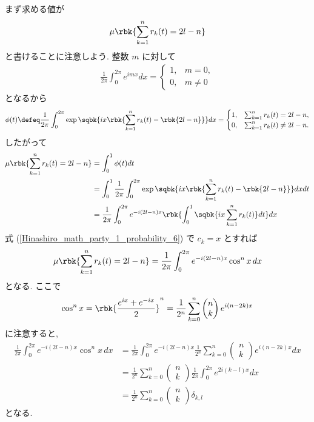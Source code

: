\documentclass[openany, a4paper, oneside]{jsbook}
\begin{document}
{まず求める値が
\begin{align}
 \mu \rbk{\sum_{k=1}^{n} r_k (t) = 2l - n}
\end{align}
と書けることに注意しよう.
整数 $m$ に対して
\begin{align}
 \frac{1}{2 \pi} \int_0^{2 \pi} e^{imx} dx
 =
 \begin{cases}
  1, & m=0, \\
  0, & m \neq 0
 \end{cases}
\end{align}
となるから
\begin{align}
 \phi (t)
 \defeq
 \frac{1}{2 \pi} \int_0^{2 \pi} \exp \sqbk{ix \rbk{\sum_{k=1}^{n} r_k (t) - \rbk{2l-n}}} dx
 =
 \begin{cases}
  1, &  \sum_{k=1}^{n} r_k (t) = 2l - n, \\
  0, &  \sum_{k=1}^{n} r_k (t) \neq 2l - n.
 \end{cases}
\end{align}
したがって
\begin{align}
 \mu \rbk{\sum_{k=1}^n r_k (t) = 2 l - n}
 &=
 \int_0^1 \phi (t) dt \\
 &=
 \int_0^1 \frac{1}{2 \pi} \int_0^{2 \pi} \exp \sqbk{ix \rbk{\sum_{k=1}^{n} r_k (t) - \rbk{2l-n}}} dx dt \\
 &=
 \frac{1}{2 \pi} \int_0^{2 \pi} e^{-i (2l -n) x} \rbk{\int_0^1 \sqbk{ix \sum_{k=1}^{n} r_k (t)} dt} dx
\end{align}
式 (\ref{Hinashiro_math_party_1_probability_6}) で $c_k = x$ とすれば
\begin{align}
 \mu \rbk{\sum_{k=1}^n r_k (t) = 2 l - n}
 =
 \frac{1}{2 \pi} \int_0^{2 \pi} e^{-i (2l -n) x} \cos^n x \, dx
\end{align}
となる.
ここで
\begin{align}
 \cos^n x
 =
 \rbk{\frac{e^{ix} + e^{-ix}}{2}}^n
 =
 \frac{1}{2^n} \sum_{k=0}^n
 \begin{pmatrix}
  n \\
  k
 \end{pmatrix}
 e^{i (n - 2k) x}
\end{align}
に注意すると,
\begin{align}
 \frac{1}{2 \pi} \int_0^{2 \pi} e^{-i (2l -n) x} \cos^n x \, dx
 &=
 \frac{1}{2 \pi} \int_0^{2 \pi} e^{-i (2l -n) x}
  \frac{1}{2^n} \sum_{k=0}^n
  \begin{pmatrix}
   n \\
   k
  \end{pmatrix}
  e^{i (n - 2k) x} dx \\
 &=
 \frac{1}{2^n} \sum_{k=0}^n
  \begin{pmatrix}
   n \\
   k
  \end{pmatrix}
  \frac{1}{2 \pi}
  \int_0^{2 \pi} e^{2 i (k - l) x} dx \\
 &=
 \frac{1}{2^n} \sum_{k=0}^n
  \begin{pmatrix}
   n \\
   k
  \end{pmatrix}
  \delta_{k,l}
\end{align}
となる.

}
\end{document}
